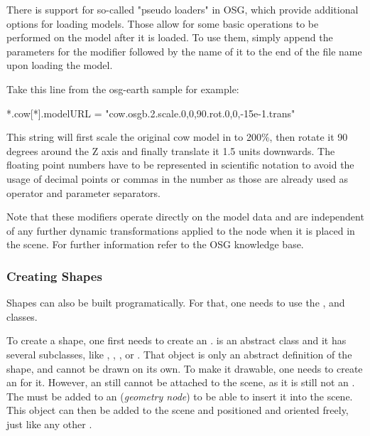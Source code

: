 There is support for so-called "pseudo loaders" in OSG, which provide
additional options for loading models. Those allow for some basic
operations to be performed on the model after it is loaded. To use them,
simply append the parameters for the modifier followed by the name of it to
the end of the file name upon loading the model.

Take this line from the osg-earth sample for example:

\begin{inifile}
*.cow[*].modelURL = "cow.osgb.2.scale.0,0,90.rot.0,0,-15e-1.trans"
\end{inifile}

This string will first scale the original cow model in  to
200\%, then rotate it 90 degrees around the Z axis and finally translate it
1.5 units downwards. The floating point numbers have to be represented in
scientific notation to avoid the usage of decimal points or commas in the
number as those are already used as operator and parameter separators.

Note that these modifiers operate directly on the model data and are
independent of any further dynamic transformations applied to the node when
it is placed in the scene. For further information refer to the OSG
knowledge base.

\subsubsection{Creating Shapes}

Shapes can also be built programatically. For that, one needs to use the
,  and 
classes.

To create a shape, one first needs to create an .
 is an abstract class and it has several subclasses, like
, , ,
 or . That object is only an abstract
definition of the shape, and cannot be drawn on its own. To make it drawable,
one needs to create an  for it. However, an
 still cannot be attached to the scene, as it is still
not an . The  must be added to an
 (\textit{geometry node}) to be able to insert it into the
scene. This object can then be added to the scene and positioned and oriented
freely, just like any other .

